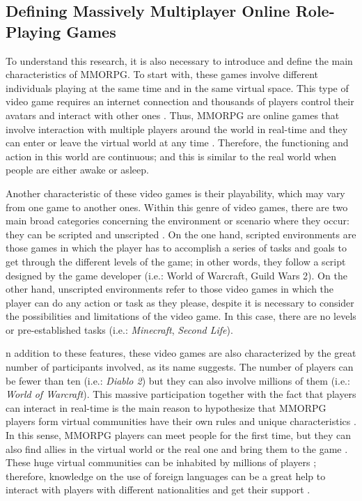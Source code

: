 \documentclass[english]{textolivre}
\begin{document}
\subsection{Defining Massively Multiplayer Online Role-Playing Games}
To understand this research, it is also necessary to introduce and define the main characteristics of MMORPG. To start with, these games involve different individuals playing at the same time and in the same virtual space. This type of video game requires an internet connection and thousands of players control their avatars and interact with other ones \cite{zhong2011}. Thus, MMORPG are online games that involve interaction with multiple players around the world in real-time \cite{barker2012} and they can enter or leave the virtual world at any time \cite{bell2008}. Therefore, the functioning and action in this world are continuous; and this is similar to the real world when people are either awake or asleep.

Another characteristic of these video games is their playability, which may vary from one game to another ones. Within this genre of video games, there are two main broad categories concerning the environment or scenario where they occur: they can be scripted and unscripted \cite{alemi2007}. On the one hand, scripted environments are those games in which the player has to accomplish a series of tasks and goals to get through the different levels of the game; in other words, they follow a script designed by the game developer (i.e.: World of Warcraft, Guild Wars 2). On the other hand, unscripted environments refer to those video games in which the player can do any action or task as they please, despite it is necessary to consider the possibilities and limitations of the video game. In this case, there are no levels or pre-established tasks (i.e.: \emph{Minecraft}, \emph{Second Life}). 

n addition to these features, these video games are also characterized by the great number of participants involved, as its name suggests. The number of players can be fewer than ten (i.e.: \emph{Diablo 2}) but they can also involve millions of them (i.e.: \emph{World of Warcraft}). This massive participation together with the fact that players can interact in real-time is the main reason to hypothesize that MMORPG players form virtual communities have their own rules and unique characteristics \cite{bradley2004, gordon2008}. In this sense, MMORPG players can meet people for the first time, but they can also find allies in the virtual world or the real one and bring them to the game \cite{dickey2007, smith2005}. These huge virtual communities can be inhabited by millions of players \cite{nakamura2009}; therefore, knowledge on the use of foreign languages can be a great help to interact with players with different nationalities and get their support \cite{cornillie2012, reinders2009}.
\end{document}
